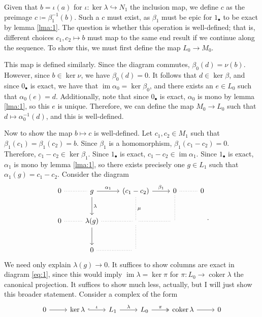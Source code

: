 \documentclass[11pt, letterpaper]{article}
\DeclareMathOperator{\im}{im}
\DeclareMathOperator{\coker}{coker}
\renewenvironment{proof}[1][]{\begin{replacementproof2}}{\end{replacementproof2}}
\begin{document}
\begin{proof}
Given that $b=\iota (a)$ for $\iota : \ker \lambda \hookrightarrow N_1$ the inclusion map, we define $c$ as the preimage $c\coloneqq \beta _1^{-1} (b)$. Such a $c$ must exist, as $\beta_1$ must be epic for $1_\bullet $ to be exact by lemma \ref{lma:1}. The question is whether this operation is well-defined; that is, different choices $c_1,c_2\mapsto b$ must map to the same end result if we continue along the sequence. To show this, we must first define the map $L_0\to M_0$.

This map is defined similarly. Since the diagram commutes, $\beta_0(d)=\nu (b)$. However, since $b\in \ker \nu $, we have $\beta_0(d)=0$. It follows that $d\in \ker \beta $, and since $0_\bullet $ is exact, we have that $\im \alpha_0=\ker \beta_0$, and there exists an $e\in L_0$ such that $\alpha_0(e)=d$. Additionally, note that since $0_\bullet $ is exact, $\alpha_0$ is mono by lemma \ref{lma:1}, so this $e$ is unique. Therefore, we can define the map $M_0\to L_0$ such that $d\mapsto \alpha_0^{-1} (d)$, and this is well-defined.

Now to show the map $b\mapsto c$ is well-defined. Let $c_1,c_2\in M_1 $ such that $\beta_1(c_1)=\beta_1(c_2)=b$. Since $\beta_1$ is a homomorphism, $\beta_1(c_1-c_2)=0$. Therefore, $c_1-c_2\in \ker \beta_1$. Since $1_\bullet $ is exact, $c_1-c_2\in \im \alpha_1$. Since $1_\bullet $ is exact, $\alpha_1$ is mono by lemma \ref{lma:1}, so there exists precisely one $g\in L_1 $ such that $\alpha_1(g)=c_1-c_2$. Consider the diagram
\[\begin{tikzcd}[row sep = 2.5em, column sep = 2.5em]
	0\arrow[r, dotted, no head]&g\arrow[d, "\lambda "]\arrow[r, "\alpha_1"]&(c_1-c_2)\arrow[r, "\beta _1"]\arrow[d, dotted, no head, "\mu "]&0\arrow[r, dotted, no head]\arrow[d, dotted, no head]&0\\
	0\arrow[r, dotted, no head]&\lambda (g)\arrow[d]\arrow[r, dotted, no head]&\arrow[r, dotted, no head]\arrow[d, dotted, no head]&\,\\
				   &0\arrow[r, dotted, no head]&\,
\end{tikzcd}.\]
We need only explain $\lambda (g)\to 0$. It suffices to show columns are exact in diagram \eqref{eq:1}, since this would imply $\im \lambda =\ker \pi  $ for $\pi : L_0 \to \coker \lambda $ the canonical projection. It suffices to show much less, actually, but I will just show this broader statement. Consider a complex of the form
\[\begin{tikzcd}[row sep = 2.5em, column sep = 2.5em]
	0\arrow[r]&\ker \lambda \arrow[r, hook, "\iota "]&L_1\arrow[r, "\lambda "]&L_0\arrow[r, two heads, "\pi "]&\coker \lambda \arrow[r]&0 
\end{tikzcd}\]


\end{proof}
\end{document}
